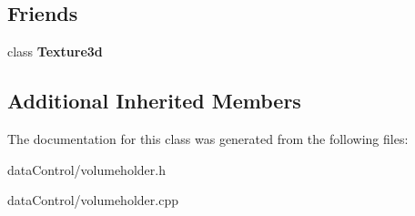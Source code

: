 \subsection*{Friends}
\begin{DoxyCompactItemize}
\item 
\hypertarget{class_tempest_1_1_volume_holder_a8e0973133e13f830fff23049233fd65a}{class {\bfseries Texture3d}}\label{class_tempest_1_1_volume_holder_a8e0973133e13f830fff23049233fd65a}

\end{DoxyCompactItemize}
\subsection*{Additional Inherited Members}


The documentation for this class was generated from the following files\+:\begin{DoxyCompactItemize}
\item 
data\+Control/volumeholder.\+h\item 
data\+Control/volumeholder.\+cpp\end{DoxyCompactItemize}
